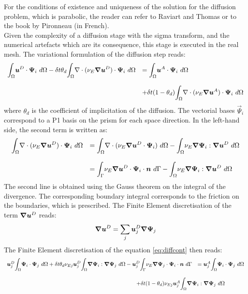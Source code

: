 For the conditions of existence and uniqueness of the solution for the diffusion
problem, which is parabolic, the reader can refer to Raviart and Thomas
\cite{raviart83} or to the book by Pironneau \cite{pironneau88} (in French).\\

Given the complexity of a diffusion stage with the sigma transform, and the
numerical artefacts which are its consequence, this stage is executed in the
real mesh.
The variational formulation of the diffusion step reads:
\begin{equation}
\begin{array}{ll}
\displaystyle{\int_\Omega}\vec{u}^D\cdot\vec{\Psi}_i~d\Omega -
\delta t \theta_d\displaystyle{\int_\Omega}\Div(\nu_{E}\Grad\vec{u}^D)\cdot\vec{\Psi}_i
~d\Omega & = \displaystyle{\int_\Omega}\vec{u}^A\cdot\vec{\Psi}_i~d\Omega \bigskip \\
& +\delta t (1-\theta_d)\displaystyle{\int_\Omega}
\Div(\nu_{E}\Grad\vec{u}^A)\cdot\vec{\Psi}_i~d\Omega
\end{array}\label{eq:diffcont}
\end{equation}
where $\theta_d$ is the coefficient of implicitation of the diffusion.
The vectorial bases $\vec{\Psi}_i$ correspond to a P1 basis on the prism
for each space direction.
In the left-hand side, the second term is written as:
\begin{equation}
\begin{array}{ll}
\displaystyle{\int_\Omega}\Div(\nu_{E}\Grad\vec{u}^D)\cdot\vec{\Psi}_i~d\Omega& =
\displaystyle{\int_\Omega}\Div(\nu_{E}\Grad\vec{u}^D\cdot\vec{\Psi}_i)~d\Omega
-\displaystyle{\int_\Omega}\nu_{E}\Grad\vec{\Psi}_i:\Grad\vec{u}^D~d\Omega \bigskip\\
& =\displaystyle{\int_\Gamma}\nu_{E}\Grad\vec{u}^D\cdot\vec{\Psi}_i\cdot\vec{n}
~d\Gamma - \displaystyle{\int_\Omega}\nu_{E}\Grad\vec{\Psi}_i:\Grad\vec{u}^D~d\Omega\end{array}
\end{equation}
The second line is obtained using the Gauss theorem on the integral of
the divergence. The corresponding boundary integral corresponds to the
friction on the boundaries, which is prescribed.
The Finite Element discretisation of the term $\bm{\nabla}\bm{u}^D$ reads:
\begin{equation}
\bm{\nabla}\bm{u}^D=\sum_j \bm{u}_j^D\bm{\nabla}\bm{\Psi}_j
\end{equation}
The Finite Element discretisation of the equation \eqref{eq:diffcont} then reads:
\begin{equation}
\begin{array}{ll}
\vec{u}_j^D\displaystyle{\int_\Omega}\vec{\Psi}_i\cdot\vec{\Psi}_j~d\Omega +
\delta t \theta_d\nu_{Ej}\vec{u}_j^D\displaystyle{\int_\Omega}\Grad\vec{\Psi}_i
:\Grad\vec{\Psi}_j~d\Omega - \vec{u}_j^D\displaystyle{\int_\Gamma}\nu_{E}\Grad\vec{\Psi}_j
\cdot\vec{\Psi}_i\cdot\vec{n}~d\Gamma& = \vec{u}_j^A\displaystyle{\int_\Omega}
\vec{\Psi}_i\cdot\vec{\Psi}_j~d\Omega \bigskip \\
& ~\hspace{-4cm}+\delta t (1-\theta_d)\nu_{Ej}\vec{u}_j^A\displaystyle{\int_\Omega}
\Grad\vec{\Psi}_i:\Grad\vec{\Psi}_j~d\Omega
\end{array}\label{eq:diff}
\end{equation}
